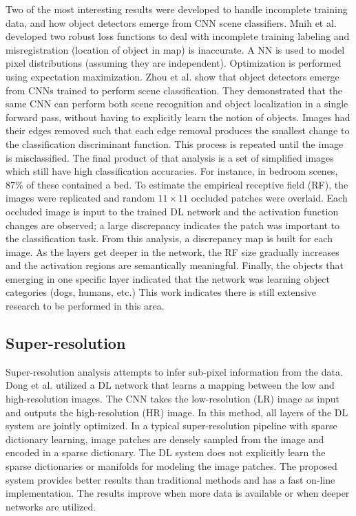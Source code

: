 \documentclass[12pt]{spieman}
\begin{document}
\begin{spacing}{1}
Two of the most interesting results were developed to handle incomplete training data, and how object detectors emerge from CNN scene classifiers. Mnih et al. \cite{Mnih2012Learning} developed two robust loss functions to deal with incomplete training labeling and misregistration (location of object in map) is inaccurate. A NN is used to model pixel distributions (assuming they are independent). Optimization is performed using expectation maximization. Zhou et al. \cite{Zhou2015Object} show that object detectors emerge from CNNs trained to perform scene classification. They demonstrated that the same CNN can perform both scene recognition and object localization in a single forward pass, without having to explicitly learn the notion of objects. Images had their edges removed such that each edge removal produces the smallest change to the classification discriminant function. This process is repeated until the image is misclassified. The final product of that analysis is a set of simplified images which still have high classification accuracies. For instance, in bedroom scenes, 87\% of these contained a bed. To estimate the empirical receptive field (RF), the images were replicated and random $11 \times 11$ occluded patches were overlaid. Each occluded image is input to the trained DL network and the activation function changes are observed; a large discrepancy indicates the patch was important to the classification task. From this analysis, a discrepancy map is built for each image. As the layers get deeper in the network, the RF size gradually increases and the activation regions are semantically meaningful. Finally, the objects that emerging in one specific layer indicated that the network was learning object categories (dogs, humans, etc.) This work indicates there is still extensive research to be performed in this area.

\subsection{Super-resolution}

Super-resolution analysis attempts to infer sub-pixel information from the data. Dong et al. \cite{dong2016image} utilized a DL network that learns a mapping between the low and high-resolution images. The CNN takes the low-resolution (LR) image as input and outputs the high-resolution (HR) image. In this method, all layers of the DL system are jointly optimized. In a typical super-resolution pipeline with sparse dictionary learning, image patches are densely sampled from the image and encoded in a sparse dictionary. The DL system does not explicitly learn the sparse dictionaries or manifolds for modeling the image patches. The proposed system provides better results than traditional methods and has a fast on-line implementation. The results improve when more data is available or when deeper networks are utilized.


\end{spacing}
\end{document}
